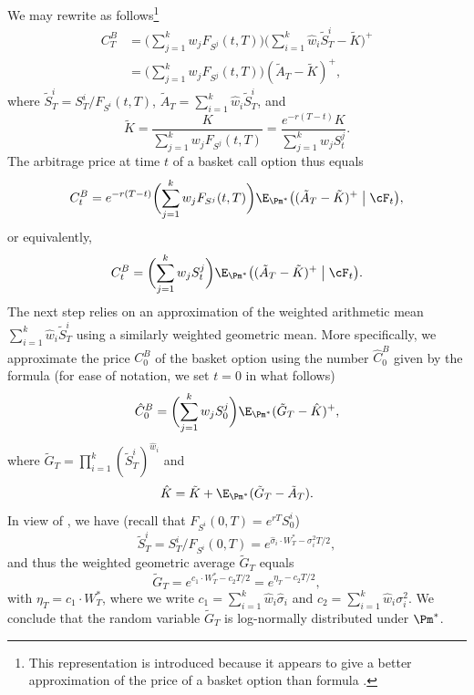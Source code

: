 We may rewrite  as follows\footnote{This representation is introduced because it appears to give a better approximation of the price of a basket option than formula .}
\begin{equation} \label{eq:BasketRewrite}
	\begin{aligned}
		C_T^B & = \biggl( \sum_{j=1}^k w_j F_{S^j}(t, T) \biggr) \biggl( \sum_{i=1}^k \hat{w}_i \tilde{S}_T^i - \tilde{K} \biggr)^+ \\
		      & = \biggl( \sum_{j=1}^k w_j F_{S^j}(t, T) \biggr) (\tilde{A}_T - \tilde{K})^+,
	\end{aligned}
\end{equation}
where \(\tilde{S}_T^i = S_T^i / F_{S^i}(t, T)\), \(\tilde{A}_T = \sum_{i=1}^k \hat{w}_i \tilde{S}_T^i\), and
\begin{equation} \label{eq:KtildeDef}
	\tilde{K} = \frac{K}{\sum_{j=1}^k w_j F_{S^j}(t, T)} = \frac{e^{-r(T-t)} K}{\sum_{j=1}^k w_j S_t^j}.
\end{equation}
The arbitrage price at time \(t\) of a basket call option thus equals
\[
	C_t^B = e^{-r(T-t)} \biggl( \sum_{j=1}^k w_j F_{S^j}(t, T) \biggr) \E_{\Pm^*} \bigl( (\tilde{A}_T - \tilde{K})^+ \bigm| \cF_t \bigr),
\]
or equivalently,
\begin{equation} \label{eq:BasketPriceT}
	C_t^B = \biggl( \sum_{j=1}^k w_j S_t^j \biggr) \E_{\Pm^*} \bigl( (\tilde{A}_T - \tilde{K})^+ \bigm| \cF_t \bigr).
\end{equation}
The next step relies on an approximation of the weighted arithmetic mean \(\sum_{i=1}^k \hat{w}_i \tilde{S}_T^i\) using a similarly weighted geometric mean. More specifically, we approximate the price \(C_0^B\) of the basket option using the number \(\hat{C}_0^B\) given by the formula (for ease of notation, we set \(t = 0\) in what follows)
\begin{equation} \label{eq:BasketApproxPrice}
	\hat{C}_0^B = \biggl( \sum_{j=1}^k w_j S_0^j \biggr) \E_{\Pm^*} (\tilde{G}_T - \hat{K})^+,
\end{equation}
where \(\tilde{G}_T = \prod_{i=1}^k (\tilde{S}_T^i)^{\hat{w}_i}\) and
\begin{equation} \label{eq:KhatDef}
	\hat{K} = \tilde{K} + \E_{\Pm^*} (\tilde{G}_T - \tilde{A}_T).
\end{equation}
In view of , we have (recall that \(F_{S^i}(0, T) = e^{rT} S_0^i\))
\[
	\tilde{S}_T^i = S_T^i / F_{S^i}(0, T) = e^{\hat{\sigma}_i \cdot W_T^* - \sigma_i^2 T / 2},
\]
and thus the weighted geometric average \(\tilde{G}_T\) equals
\begin{equation} \label{eq:GeometricAverage}
	\tilde{G}_T = e^{c_1 \cdot W_T^* - c_2 T / 2} = e^{\eta_T - c_2 T / 2},
\end{equation}
with \(\eta_T = c_1 \cdot W_T^*\), where we write \(c_1 = \sum_{i=1}^k \hat{w}_i \hat{\sigma}_i\) and \(c_2 = \sum_{i=1}^k \hat{w}_i \sigma_i^2\). We conclude that the random variable \(\tilde{G}_T\) is log-normally distributed under \(\Pm^*\).

